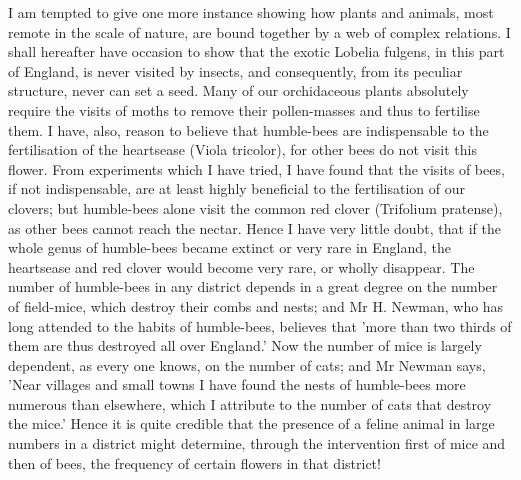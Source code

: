 \indent I am tempted to give one more instance showing how plants and animals, most remote in the scale of nature, are bound together by a web of complex relations. I shall hereafter have occasion to show that the exotic Lobelia fulgens, in this part of England, is never visited by insects, and consequently, from its peculiar structure, never can set a seed. Many of our orchidaceous plants absolutely require the visits of moths to remove their pollen-masses and thus to fertilise them. I have, also, reason to believe that humble-bees are indispensable to the fertilisation of the heartsease (Viola tricolor), for other bees do not visit this flower.  From experiments which I have tried, I have found that the visits of bees, if not indispensable, are at least highly beneficial to the fertilisation of our clovers; but humble-bees alone visit the common red clover (Trifolium pratense), as other bees cannot reach the nectar. Hence I have very little doubt, that if the whole genus of humble-bees became extinct or very rare in England, the heartsease and red clover would become very rare, or wholly disappear. The number of humble-bees in any district depends in a great degree on the number of field-mice, which destroy their combs and nests; and Mr H. Newman, who has long attended to the habits of humble-bees, believes that 'more than two thirds of them are thus destroyed all over England.' Now the number of mice is largely dependent, as every one knows, on the number of cats; and Mr Newman says, 'Near villages and small towns I have found the nests of humble-bees more numerous than elsewhere, which I attribute to the number of cats that destroy the mice.' Hence it is quite credible that the presence of a feline animal in large numbers in a district might determine, through the intervention first of mice and then of bees, the frequency of certain flowers in that district!\\
